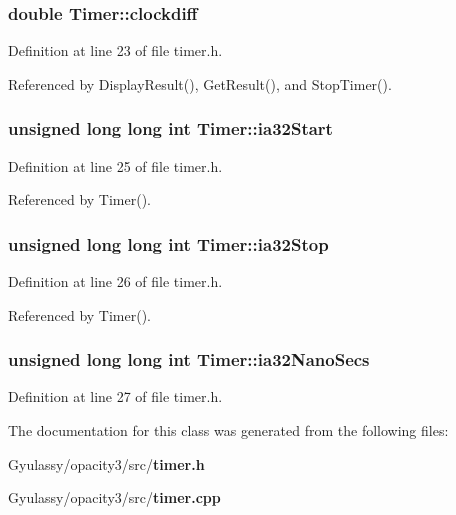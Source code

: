 \subsubsection{\setlength{\rightskip}{0pt plus 5cm}double {\bf Timer::clockdiff}\hspace{0.3cm}{\tt  [private]}}\label{classTimer_5d5b55e5c6ac25294066d1493cba740b}




Definition at line 23 of file timer.h.

Referenced by DisplayResult(), GetResult(), and StopTimer().
\subsubsection{\setlength{\rightskip}{0pt plus 5cm}unsigned long long int {\bf Timer::ia32Start}\hspace{0.3cm}{\tt  [private]}}\label{classTimer_01bbd5a781157f6531a4bc9b28756da9}




Definition at line 25 of file timer.h.

Referenced by Timer().
\subsubsection{\setlength{\rightskip}{0pt plus 5cm}unsigned long long int {\bf Timer::ia32Stop}\hspace{0.3cm}{\tt  [private]}}\label{classTimer_894bd5ca4c19e1528a735cfcff05a25d}




Definition at line 26 of file timer.h.

Referenced by Timer().
\subsubsection{\setlength{\rightskip}{0pt plus 5cm}unsigned long long int {\bf Timer::ia32NanoSecs}\hspace{0.3cm}{\tt  [private]}}\label{classTimer_ffbf82f944c5a2f58548d18f140fe0fc}




Definition at line 27 of file timer.h.

The documentation for this class was generated from the following files:\begin{CompactItemize}
\item 
Gyulassy/opacity3/src/{\bf timer.h}\item 
Gyulassy/opacity3/src/{\bf timer.cpp}\end{CompactItemize}
